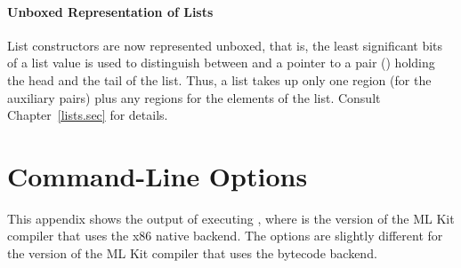 \documentclass[12pt]{book}
\begin{document}
\subsubsection*{Unboxed Representation of Lists}
 List constructors are now represented unboxed, that is,
the least significant bits of a list value is used to distinguish
between  and a pointer to a pair (\boxml{::}) holding the
head and the tail of the list. Thus, a list takes up only one region
(for the auxiliary pairs) plus any regions for the elements of the
list. Consult Chapter~\ref{lists.sec} for details.

\nocite{total97,total94,btv96,elshal95,KochHojfeld96,H96,hallenberg99,brtt93}




\appendix

\chapter{Command-Line Options}
\label{mlkithelp.app}
This appendix shows the output of executing 
%
, where  is the version of the ML Kit
compiler that uses the 
%
x86 native backend. The options are slightly different for the version
of the ML Kit compiler that uses the bytecode backend.
\end{document}
